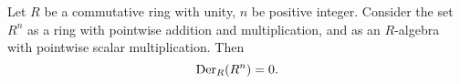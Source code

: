 \begin{proposition}
  Let $R$ be a commutative ring with unity, $n$ be  positive integer.
  Consider the set $R^n$ as a ring with pointwise addition and multiplication,
  and as an $R$-algebra with pointwise scalar multiplication.
  Then
  \begin{equation}
    {\rm Der}_R(R^n) = 0.
  \end{equation}
\end{proposition}
